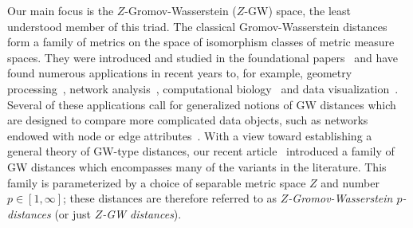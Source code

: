 \documentclass{article}
\theoremstyle{definition}
\begin{document}
%
%
%
%
%
%
%
%
%
%
%
%
%
%
%
%
%
%

Our main focus is the $Z$-Gromov-Wasserstein ($Z$-GW) space, the least understood member of this triad. The classical Gromov-Wasserstein distances form a family of metrics on the space of isomorphism classes of metric measure spaces. They were introduced and studied in the foundational papers~\cite{Memoli_2007,Memoli2011GromovWasserstein} and have found numerous applications in recent years to, for example, geometry processing~\cite{peyre2016gromov,solomon2016entropic,chowdhury2021quantized}, network analysis~\cite{chowdhury2019gromovwassersteindistancenetworksstable,xu2019scalable,Vayer2020FGW,chowdhury2021generalized}, computational biology~\cite{demetci2022scot,demetci2022scotv2} and data visualization~\cite{vandistributional, clark2025generalized}. Several of these applications call for generalized notions of GW distances which are designed to compare more complicated data objects, such as networks endowed with node or edge attributes~\cite{Vayer2020FGW,kawano2024multi}. With a view toward establishing a general theory of GW-type distances, our recent article~\cite{bauer2025zgromovwassersteindistance} introduced a family of GW distances which encompasses many of the variants in the literature. This family is parameterized by a choice of separable metric space $Z$ and number $p \in [1,\infty]$;  these distances are therefore referred to as \emph{$Z$-Gromov-Wasserstein $p$-distances} (or just \emph{$Z$-GW distances}). 
\end{document}
